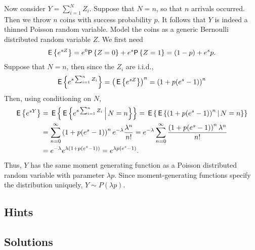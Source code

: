 \begin{question}
\begin{solution}
Now consider $Y=\sum_{i=1}^N Z_i$. Suppose that $N=n$, so that $n$
arrivals occurred. Then we throw $n$ coins with success probability
$p$. It follows that $Y$ is indeed a thinned Poisson random variable.
Model the coins as a generic Bernoulli distributed random variable
$Z$.  We first need
\begin{equation*}
  \E{e^{s Z}} = e^0 \P{Z=0} + e^{s} \P{Z=1} = (1-p) + e^s p.
\end{equation*}
Suppose that $N=n$, then since the $Z_i$ are i.i.d.,
\begin{equation*}
\,\mathsf{E}\left\{e^{s\sum_{i=1}^n Z_i}\right\} = \left(\,\mathsf{E}\left\{e^{s Z}\right\}\right)^n = \left(1 + p (e^s - 1)\right)^n
\end{equation*}
Then, using conditioning on $N$, 
\begin{equation*}
  \begin{split}
  \,\mathsf{E}\left\{e^{s Y}\right\}
&= \,\mathsf{E}\left\{\,\mathsf{E}\left\{e^{s\sum_{i=1}^n Z_i} \,\middle|\, N=n \right\}\right\} 
 = \,\mathsf{E}\left\{\,\mathsf{E}\left\{\left(1+p(e^s-1)\right)^n \,\middle|\, N=n \right\}\right\} \\
&= \sum_{n=0}^\infty \left(1+p(e^s-1)\right)^n e^{-\lambda} \frac{\lambda^n}{n!}
= e^{-\lambda} \sum_{n=0}^\infty \frac{\left(1+p(e^s-1)\right)^n \lambda^n}{n!}\\
&= e^{-\lambda} e^{\lambda (1+p(e^s-1))} = e^{\lambda p (e^s - 1)}.
  \end{split}
\end{equation*}
Thus, $Y$ has the same moment generating function as a Poisson
distributed random variable with parameter $\lambda p$. Since
moment-generating functions specify the distribution uniquely,
$Y\sim P(\lambda p)$.

\end{solution}
\end{question}    


\subsection*{Hints}

\subsection*{Solutions}

\clearpage

